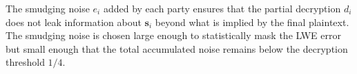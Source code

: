 The smudging noise $e_i$ added by each party ensures that the partial
decryption $d_i$ does not leak information about $\mathbf{s}_i$ beyond
what is implied by the final plaintext.  The smudging noise is chosen
large enough to statistically mask the LWE error but small enough that
the total accumulated noise remains below the decryption threshold
$1/4$.

